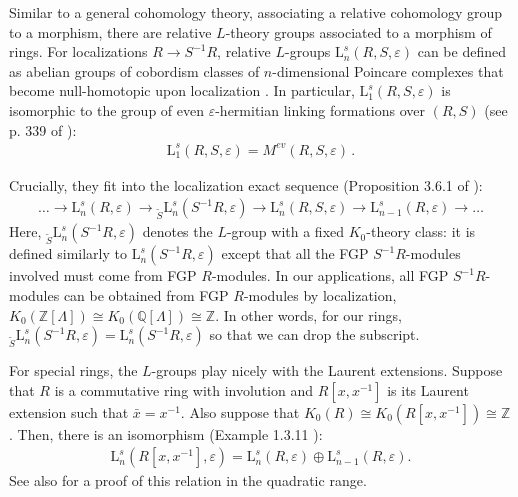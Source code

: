\documentclass[sn-mathphys-num]{sn-jnl}
\theoremstyle{definition}
\numberwithin{equation}{section}
\theoremstyle{definition}
\def\L{{\mbox{L}}}
\def\ep{\varepsilon}
\def\IQ{\mathbb{Q}}
\def\IZ{{\mathbb{Z}}}
\def\La{{\Lambda}}
\def\lr{\longrightarrow}
\begin{document}
Similar to a general cohomology theory, associating a relative cohomology group to a morphism, there are relative $L$-theory groups associated to a morphism of rings. For localizations $R\to S^{-1}R$, relative $L$-groups $\L_n^s(R,S,\ep)$ can be defined as abelian groups of cobordism classes of $n$-dimensional Poincare complexes that become null-homotopic upon localization \cite{Ranicki1981ExactSI}. In particular, $\L^{s}_1(R,S,\ep)$ is isomorphic to the group of even $\ep$-hermitian linking formations over $(R,S)$ (see p. 339 of \cite{Ranicki1981ExactSI}):
\begin{align}
    \L_1^s(R,S,\ep)=M^{ev}(R,S,\ep)\,.
\end{align}

Crucially, they fit into the localization exact sequence (Proposition 3.6.1 of \cite{Ranicki1981ExactSI}):
\begin{align}\label{eq:LocalizationLES}
    \ldots\lr \L^{s}_n(R,\ep)\lr {}_{\tilde{S}}\L^s_n(S^{-1}R,\ep)\lr \L_n^s(R,S,\ep)\lr \L^s_{n-1}(R,\ep)\lr\ldots
\end{align}
Here, ${}_{\tilde S}\L^s_n(S^{-1}R,\ep)$ denotes the $L$-group with a fixed $K_0$-theory class: it is defined similarly to $\L^s_n(S^{-1}R,\ep)$ except that all the FGP $S^{-1}R$-modules involved must come from FGP $R$-modules. In our applications, all FGP $S^{-1}R$-modules can be obtained from FGP $R$-modules by localization, $K_0(\IZ[\La])\cong K_0(\IQ[\La])\cong \IZ$. In other words, for our rings, ${}_{\tilde S}\L^s_n(S^{-1}R,\ep)=\L^s_n(S^{-1}R,\ep)$ so that we can drop the subscript.

For special rings, the $L$-groups play nicely with the 
Laurent extensions. Suppose that $R$ is a commutative ring with involution and $R[x,x^{-1}]$ is its Laurent extension such that $\bar x=x^{-1}$. Also suppose that $K_0(R)\cong K_0(R[x,x^{-1}])\cong  \IZ$. Then, there is an isomorphism (Example 1.3.11 \cite{calmes2020hermitian3}):
\begin{align}\label{eq:LsSplitting}
    \L^{s}_n(R[x,x^{-1}],\ep)= \L^{s}_n(R,\ep)\oplus  \L^{s}_{n-1}(R,\ep) .
\end{align}
 See also \cite{Ranicki1973II} for a proof of this relation in the quadratic range.
\end{document}
